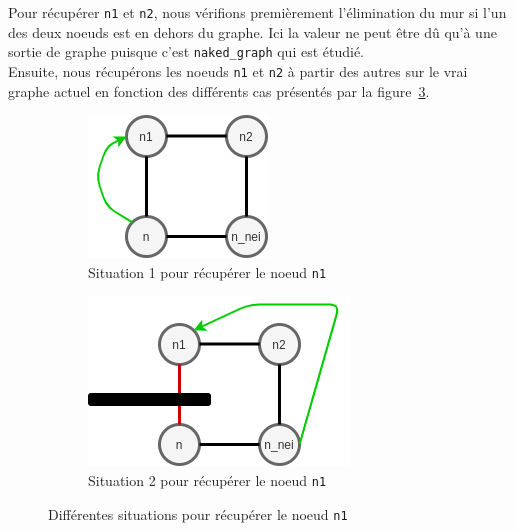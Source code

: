 \documentclass[a4paper]{article}
\begin{document}
Pour récupérer \texttt{n1} et \texttt{n2}, nous vérifions premièrement l'élimination du mur si l'un des deux noeuds est en dehors du graphe. Ici la valeur  ne peut être dû qu'à une sortie de graphe puisque c'est \texttt{naked\_graph} qui est étudié. \\

Ensuite, nous récupérons les noeuds \texttt{n1} et \texttt{n2} à partir des autres sur le vrai graphe actuel en fonction des différents cas présentés par la figure~\ref{fig:valid_walls_get}.

\begin{figure}[ht]
    \centering
    \begin{subfigure}{.5\textwidth}
        \centering
        \includegraphics[width=0.6\linewidth]{valid_walls_get1.png}
        \caption{Situation 1 pour récupérer le noeud \texttt{n1}}
        \label{fig:valid_walls_get1}
    \end{subfigure}%
    \begin{subfigure}{.5\textwidth}
        \centering
        \includegraphics[width=0.75\linewidth]{valid_walls_get2.png}
        \caption{Situation 2 pour récupérer le noeud \texttt{n1}}
        \label{fig:valid_walls_get2}
    \end{subfigure}
    
    \caption{Différentes situations pour récupérer le noeud \texttt{n1}}
    \label{fig:valid_walls_get}
\end{figure}
\end{document}
